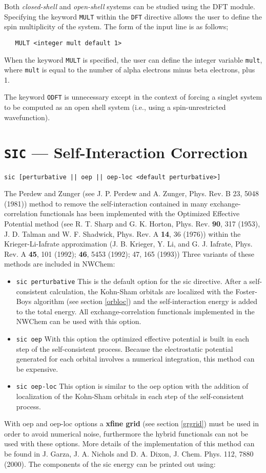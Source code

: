 Both {\sl closed-shell} and {\sl open-shell} systems can be studied using
the DFT module.  Specifying the keyword \verb+MULT+ within the \verb+DFT+
directive allows the user to define the spin multiplicity of the system.
The form of the input line is as follows;
\begin{verbatim}
   MULT <integer mult default 1> 
\end{verbatim}
When the keyword \verb+MULT+ is specified, the user can define the integer
variable \verb+mult+, where \verb+mult+ is equal to the number of alpha 
electrons minus beta electrons, plus 1.

The keyword \verb+ODFT+ is unnecessary except in the context
of forcing a singlet system to be computed as an open shell
system (i.e., using a spin-unrestricted wavefunction).

\section{{\tt SIC} --- Self-Interaction Correction}

\begin{verbatim}
sic [perturbative || oep || oep-loc <default perturbative>]
\end{verbatim}

The Perdew and Zunger (see J. P. Perdew and A. Zunger, Phys. Rev. B 23,
5048 (1981)) method to remove the self-interaction contained in many
exchange-correlation functionals has been implemented with the
Optimized Effective Potential method 
(see R. T. Sharp and G. K. Horton, Phys. Rev. {\bf 90}, 317 (1953),
J. D. Talman and W. F. Shadwick, Phys. Rev. A {\bf 14}, 36 (1976))
within the Krieger-Li-Iafrate approximation (J. B. Krieger, Y.  Li, 
and G. J. Iafrate, Phys. Rev. A {\bf 45}, 101 (1992); {\bf 46}, 5453 (1992); 
47, 165 (1993))
Three variants of these methods are included in NWChem:
\begin{itemize}
\item{\tt  sic perturbative} This is the default option for the sic
directive. After a self-consistent calculation, the Kohn-Sham
orbitals are localized with the Foster-Boys algorithm (see section
\ref{orbloc}) and the self-interaction energy is added to the total energy. 
All exchange-correlation functionals implemented in the NWChem can be
used with this option.
\item{\tt  sic oep} With this option the optimized effective potential is
built in each step of the self-consistent process. Because the electrostatic
potential generated for each orbital involves a numerical
integration, this method can be expensive.
\item{\tt  sic oep-loc} 
This option is similar to the oep option with the
addition of localization of the Kohn-Sham orbitals in each step of the 
self-consistent process.
\end{itemize}
With oep and oep-loc options a {\bf xfine grid} (see section \ref{grgrid})
must be used in order to avoid numerical noise, furthermore the hybrid 
functionals can not be used with these options.  More details of the
implementation of this method can be found in 
J. Garza, J. A. Nichols and D. A. Dixon, J. Chem. Phys. 112, 7880 (2000). 
The components of the sic energy can be printed out using:

